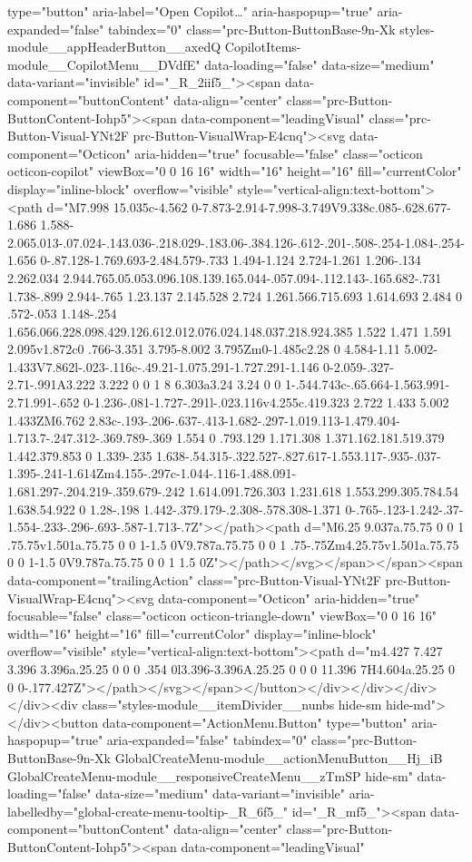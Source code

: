 {{{type="button" aria-label="Open Copilot…" aria-haspopup="true" aria-expanded="false" tabindex="0" class="prc-Button-ButtonBase-9n-Xk styles-module__appHeaderButton__axedQ CopilotItems-module__CopilotMenu__DVdfE" data-loading="false" data-size="medium" data-variant="invisible" id="_R_2iif5_"><span data-component="buttonContent" data-align="center" class="prc-Button-ButtonContent-Iohp5"><span data-component="leadingVisual" class="prc-Button-Visual-YNt2F prc-Button-VisualWrap-E4cnq"><svg data-component="Octicon" aria-hidden="true" focusable="false" class="octicon octicon-copilot" viewBox="0 0 16 16" width="16" height="16" fill="currentColor" display="inline-block" overflow="visible" style="vertical-align:text-bottom"><path d="M7.998 15.035c-4.562 0-7.873-2.914-7.998-3.749V9.338c.085-.628.677-1.686 1.588-2.065.013-.07.024-.143.036-.218.029-.183.06-.384.126-.612-.201-.508-.254-1.084-.254-1.656 0-.87.128-1.769.693-2.484.579-.733 1.494-1.124 2.724-1.261 1.206-.134 2.262.034 2.944.765.05.053.096.108.139.165.044-.057.094-.112.143-.165.682-.731 1.738-.899 2.944-.765 1.23.137 2.145.528 2.724 1.261.566.715.693 1.614.693 2.484 0 .572-.053 1.148-.254 1.656.066.228.098.429.126.612.012.076.024.148.037.218.924.385 1.522 1.471 1.591 2.095v1.872c0 .766-3.351 3.795-8.002 3.795Zm0-1.485c2.28 0 4.584-1.11 5.002-1.433V7.862l-.023-.116c-.49.21-1.075.291-1.727.291-1.146 0-2.059-.327-2.71-.991A3.222 3.222 0 0 1 8 6.303a3.24 3.24 0 0 1-.544.743c-.65.664-1.563.991-2.71.991-.652 0-1.236-.081-1.727-.291l-.023.116v4.255c.419.323 2.722 1.433 5.002 1.433ZM6.762 2.83c-.193-.206-.637-.413-1.682-.297-1.019.113-1.479.404-1.713.7-.247.312-.369.789-.369 1.554 0 .793.129 1.171.308 1.371.162.181.519.379 1.442.379.853 0 1.339-.235 1.638-.54.315-.322.527-.827.617-1.553.117-.935-.037-1.395-.241-1.614Zm4.155-.297c-1.044-.116-1.488.091-1.681.297-.204.219-.359.679-.242 1.614.091.726.303 1.231.618 1.553.299.305.784.54 1.638.54.922 0 1.28-.198 1.442-.379.179-.2.308-.578.308-1.371 0-.765-.123-1.242-.37-1.554-.233-.296-.693-.587-1.713-.7Z"></path><path d="M6.25 9.037a.75.75 0 0 1 .75.75v1.501a.75.75 0 0 1-1.5 0V9.787a.75.75 0 0 1 .75-.75Zm4.25.75v1.501a.75.75 0 0 1-1.5 0V9.787a.75.75 0 0 1 1.5 0Z"></path></svg></span></span><span data-component="trailingAction" class="prc-Button-Visual-YNt2F prc-Button-VisualWrap-E4cnq"><svg data-component="Octicon" aria-hidden="true" focusable="false" class="octicon octicon-triangle-down" viewBox="0 0 16 16" width="16" height="16" fill="currentColor" display="inline-block" overflow="visible" style="vertical-align:text-bottom"><path d="m4.427 7.427 3.396 3.396a.25.25 0 0 0 .354 0l3.396-3.396A.25.25 0 0 0 11.396 7H4.604a.25.25 0 0 0-.177.427Z"></path></svg></span></button></div></div></div></div><div class="styles-module__itemDivider__nunbs hide-sm hide-md"></div><button data-component="ActionMenu.Button" type="button" aria-haspopup="true" aria-expanded="false" tabindex="0" class="prc-Button-ButtonBase-9n-Xk GlobalCreateMenu-module__actionMenuButton__Hj_iB GlobalCreateMenu-module__responsiveCreateMenu__zTmSP hide-sm" data-loading="false" data-size="medium" data-variant="invisible" aria-labelledby="global-create-menu-tooltip-_R_6f5_" id="_R_mf5_"><span data-component="buttonContent" data-align="center" class="prc-Button-ButtonContent-Iohp5"><span data-component="leadingVisual" }}}
